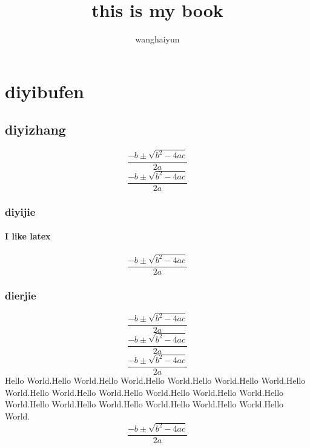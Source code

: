 \documentclass{book} %
\begin{document}
\title{this is my book}
\author{wanghaiyun}
\date{}

\maketitle

\tableofcontents
\mainmatter

\part{diyibufen}
\chapter{diyizhang}
\begin{equation}
\frac{{ - b \pm \sqrt {{b^2} - 4ac} }}{{2a}}
\end{equation}
\begin{equation}
\frac{{ - b \pm \sqrt {{b^2} - 4ac} }}{{2a}}
\end{equation}
\section{diyijie}
\subsection{I like latex}
\begin{equation}
\frac{{ - b \pm \sqrt {{b^2} - 4ac} }}{{2a}}
\end{equation}
\section{dierjie}
\begin{equation}
\frac{{ - b \pm \sqrt {{b^2} - 4ac} }}{{2a}}
\end{equation}
\begin{equation}
\frac{{ - b \pm \sqrt {{b^2} - 4ac} }}{{2a}}
\end{equation}
\begin{equation}
\frac{{ - b \pm \sqrt {{b^2} - 4ac} }}{{2a}}
\end{equation}
Hello World.Hello World.Hello World.Hello World.Hello World.Hello World.Hello World.Hello World.Hello World.Hello World.Hello World.Hello World.Hello World.Hello World.Hello World.Hello World.Hello World.Hello World.Hello World.
\begin{equation}
\frac{{ - b \pm \sqrt {{b^2} - 4ac} }}{{2a}}
\end{equation}
\end{document}
